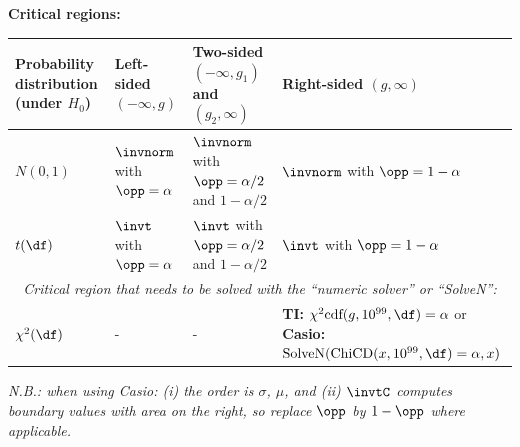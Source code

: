 \documentclass[11pt,a4paper,english]{article} %
\begin{document}
\textbf{Critical regions:}
    \begin{center}
        \renewcommand{\arraystretch}{1.5}
        \begin{tabular}{m{}|m{}|m{}|m{}}
            \toprule
                \textbf{Probability distribution (under $H_0$)} & \textbf{Left-sided} \newline $(-\infty, g)$ & \textbf{Two-sided} \newline $(-\infty, g_1)$ and $(g_2, \infty)$ & \textbf{Right-sided} \newline $(g, \infty)$ \\
            \midrule
                $N\left(0, 1\right)$ & $\invnorm$ with \newline $\opp=\alpha$ & $\invnorm$ with \newline $\opp=\alpha/2$ and $1-\alpha/2$ & $\invnorm$ with \newline $\opp=1-\alpha$ \\
            \midrule
                $t(\df)$ & $\invt$ with \newline $\opp=\alpha$ & $\invt$ with \newline $\opp=\alpha/2$ and $1-\alpha/2$ & $\invt$ with \newline $\opp=1-\alpha$ \\
            \midrule
                \multicolumn{4}{c}{\emph{Critical region that needs to be solved with the \enquote{numeric solver} or \enquote{SolveN}:}} \\
            \midrule
                $\chi^2(\df)$ & - & - & \textbf{TI:} $\chi^2\text{cdf}(g, 10^{99}, \df) = \alpha$ or \textbf{Casio:} \newline $\textrm{SolveN}(\textrm{ChiCD}(x, 10^{99}, \df)=\alpha,x)$ \\
            \bottomrule
        \end{tabular}
    \end{center}

    \emph{N.B.: when using Casio: (i) the order is $\sigma$, $\mu$, and (ii) $\invtC$ computes boundary values with area on the right, so replace $\opp$ by $1 - \opp$ where applicable.}

\newpage
\end{document}

